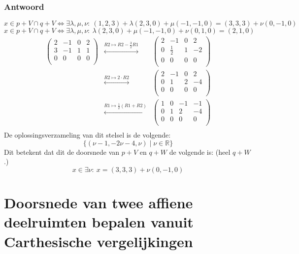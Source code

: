 \documentclass[main.tex]{subfiles}
\begin{document}
\subsubsection{Antwoord}
\[
x\in p+V\cap q+V \Leftrightarrow \exists \lambda, \mu, \nu:\ (1,2,3) + \lambda (2,3,0) + \mu (-1,-1,0) = (3,3,3) + \nu (0,-1,0)
\]
\[
x\in p+V\cap q+V \Leftrightarrow \exists \lambda, \mu, \nu:\ 
\lambda (2,3,0) + \mu (-1,-1,0) + \nu (0,1,0) = (2,1,0)
\]
\[
\begin{array}{rcc}
  \left(
    \begin{array}{ccc|c}
      2 & -1 & 0 & 2\\
      3 & -1 & 1 & 1\\
      0 & 0 & 0 & 0\\
    \end{array}
  \right)
  &\overset{R2 \mapsto R2-\frac{3}{2}R1}{\longleftrightarrow}&
  \left(
    \begin{array}{ccc|c}
      2 & -1 & 0 & 2\\
      0 & \frac{1}{2} & 1 & -2\\
      0 & 0 & 0 & 0\\
    \end{array}
  \right)
  \\
  &\overset{R2 \mapsto 2\cdot R2}{\longleftrightarrow}&
  \left(
    \begin{array}{ccc|c}
      2 & -1 & 0 & 2\\
      0 & 1 & 2 & -4\\
      0 & 0 & 0 & 0\\
    \end{array}
  \right)\\
  &\overset{R1 \mapsto \frac{1}{2}(R1+R2)}{\longleftrightarrow}&
  \left(
    \begin{array}{ccc|c}
      1 & 0 & -1 & -1\\
      0 & 1 & 2 & -4\\
      0 & 0 & 0 & 0\\
    \end{array}
  \right)\\
\end{array}
\]
De oplossingsverzameling van dit stelsel is de volgende:
\[
\{ (\nu-1,-2\nu-4,\nu) \mid \nu \in \mathbb{R} \}
\]
Dit betekent dat dit de doorsnede van $p+V$ en $q+W$ de volgende is: (heel $q+W$.)
\[ x\in \exists \nu:\ x = (3,3,3) + \nu (0,-1,0) \]

\newpage
\section{Doorsnede van twee affiene deelruimten bepalen vanuit Carthesische vergelijkingen}
\end{document}

